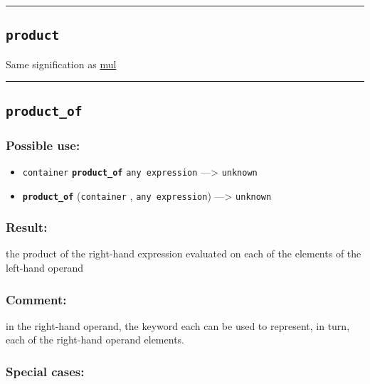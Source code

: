 \documentclass[]{book}
\providecommand{\tightlist}{%
  \setlength{\itemsep}{0pt}\setlength{\parskip}{0pt}}
\theoremstyle{definition}
\theoremstyle{definition}
\theoremstyle{definition}
\theoremstyle{remark}
\begin{document}
\begin{center}\rule{0.5\linewidth}{\linethickness}\end{center}

\subsection{\texorpdfstring{\texttt{product}}{product}}\label{product}

Same signification as \href{OperatorsIM\#mul}{mul}

\begin{center}\rule{0.5\linewidth}{\linethickness}\end{center}

\subsection{\texorpdfstring{\texttt{product\_of}}{product\_of}}\label{product_of}

\subsubsection{Possible use:}\label{possible-use-418}

\begin{itemize}
\tightlist
\item
  \texttt{container} \textbf{\texttt{product\_of}}
  \texttt{any\ expression} ---\textgreater{} \texttt{unknown}
\item
  \textbf{\texttt{product\_of}} (\texttt{container} ,
  \texttt{any\ expression}) ---\textgreater{} \texttt{unknown}
\end{itemize}

\subsubsection{Result:}\label{result-404}

the product of the right-hand expression evaluated on each of the
elements of the left-hand operand

\subsubsection{Comment:}\label{comment-79}

in the right-hand operand, the keyword each can be used to represent, in
turn, each of the right-hand operand elements.

\subsubsection{Special cases:}\label{special-cases-113}
\end{document}
